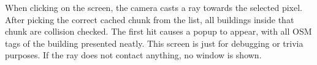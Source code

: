 When clicking on the screen, the camera casts a ray towards the selected pixel. After picking the correct cached chunk from the list, all buildings inside that chunk are collision checked. The first hit causes a popup to appear, with all OSM tags of the building presented neatly. This screen is just for debugging or trivia purposes. If the ray does not contact anything, no window is shown.